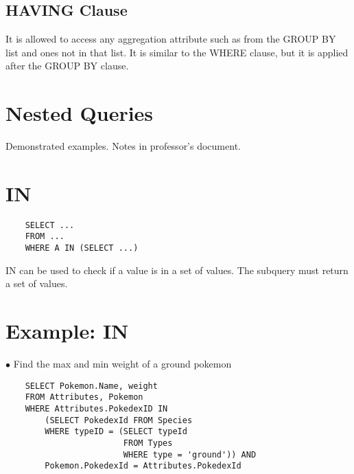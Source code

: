 \documentclass[twoside]{article}
\begin{document}
\subsection*{HAVING Clause}
It is allowed to access any aggregation attribute such as from the GROUP BY
list and ones not in that list. It is similar to the WHERE clause, but it 
is applied after the GROUP BY clause.

\section*{Nested Queries}
Demonstrated examples. Notes in professor's document.

\newpage
\hfill \break
{}

\section*{IN}
\begin{verbatim}
    SELECT ...
    FROM ...
    WHERE A IN (SELECT ...)
\end{verbatim}
IN can be used to check if a value is in a set of values. The subquery must
return a set of values.

\section*{Example: IN}
$\bullet$ Find the max and min weight of a ground pokemon
\begin{verbatim}
    SELECT Pokemon.Name, weight
    FROM Attributes, Pokemon
    WHERE Attributes.PokedexID IN
        (SELECT PokedexId FROM Species
        WHERE typeID = (SELECT typeId
                        FROM Types 
                        WHERE type = 'ground')) AND 
        Pokemon.PokedexId = Attributes.PokedexId
\end{verbatim}
\end{document}
